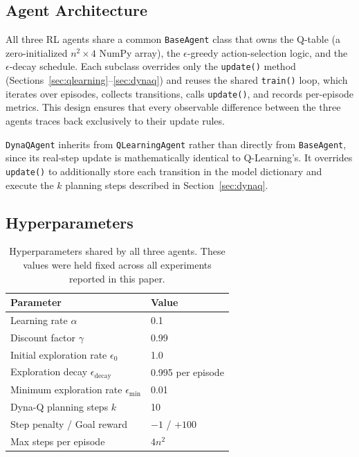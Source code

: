 \documentclass[11pt]{article}
\begin{document}
\subsection{Agent Architecture}

All three RL agents share a common \texttt{BaseAgent} class that owns the
Q-table (a zero-initialized $n^2 \times 4$ NumPy array), the
$\epsilon$-greedy action-selection logic, and the $\epsilon$-decay
schedule. Each subclass overrides only the \texttt{update()} method
(Sections~\ref{sec:qlearning}--\ref{sec:dynaq}) and reuses the shared
\texttt{train()} loop, which iterates over episodes, collects transitions,
calls \texttt{update()}, and records per-episode metrics. This design
ensures that every observable difference between the three agents traces
back exclusively to their update rules.

\texttt{DynaQAgent} inherits from \texttt{QLearningAgent} rather than
directly from \texttt{BaseAgent}, since its real-step update is
mathematically identical to Q-Learning's. It overrides \texttt{update()}
to additionally store each transition in the model dictionary and execute
the $k$ planning steps described in Section~\ref{sec:dynaq}.

\subsection{Hyperparameters}

\begin{table}[H]
\centering
\caption{Hyperparameters shared by all three agents. These values were
held fixed across all experiments reported in this paper.}
\label{tab:hyperparams}
\begin{tabular}{ll}
\toprule
Parameter & Value \\
\midrule
Learning rate $\alpha$ & 0.1 \\
Discount factor $\gamma$ & 0.99 \\
Initial exploration rate $\epsilon_0$ & 1.0 \\
Exploration decay $\epsilon_{\text{decay}}$ & 0.995 per episode \\
Minimum exploration rate $\epsilon_{\min}$ & 0.01 \\
Dyna-Q planning steps $k$ & 10 \\
Step penalty / Goal reward & $-1$ / $+100$ \\
Max steps per episode & $4n^2$ \\
\bottomrule
\end{tabular}
\end{table}
\end{document}
